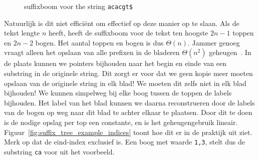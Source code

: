 \begin{figure}[H]
    \center
    \caption{suffixboom voor the string \texttt{acacgt\$}}\label{fig:suffix_tree_example}

\end{figure}

Natuurlijk is dit niet efficiënt om effectief op deze manier op te slaan.
Als de tekst lengte $n$ heeft, heeft de suffixboom voor de tekst ten hoogste $2n - 1$ toppen en $2n - 2$ bogen.
Het aantal toppen en bogen is dus $\Theta(n)$.
Jammer genoeg vraagt alleen het opslaan van alle prefixen in de bladeren $\Theta(n^2)$ geheugen~\cite{AD3_ukkonen}.
In de plaats kunnen we pointers bijhouden naar het begin en einde van een substring in de originele string.
Dit zorgt er voor dat we geen kopie meer moeten opslaan van de originele string in elk blad!
We moeten dit zelfs niet in elk blad bijhouden!
We kunnen simpelweg bij elke boog tussen de toppen de labels bijhouden.
Het label van het blad kunnen we daarna reconstrueren door de labels van de bogen op weg naar dit blad te achter elkaar te plaatsen.
Door dit te doen is de nodige opslag per top een constante, en is het geheugengebruik lineair.
Figuur~\ref{fig:suffix_tree_example_indices} toont hoe dit er in de praktijk uit ziet.
Merk op dat de eind-index exclusief is.
Een boog met waarde \texttt{1,3}, stelt dus de substring \texttt{ca} voor uit het voorbeeld.

